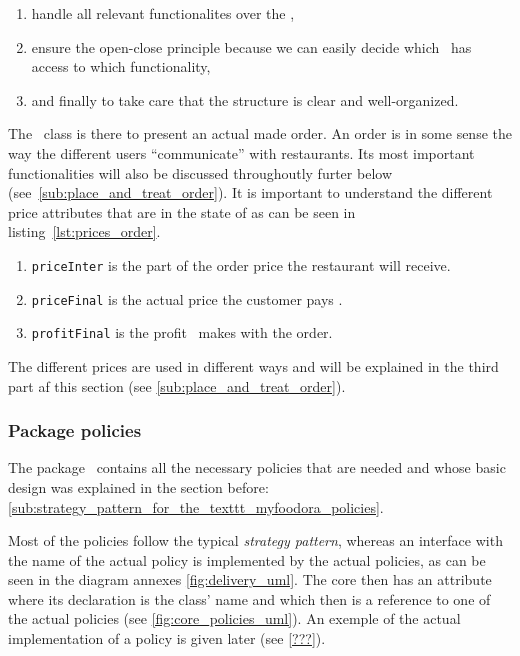 \begin{enumerate}
	\item handle all relevant functionalites over the \Core,
	\item ensure the open-close principle because we can easily decide
  which \User~has access to which functionality,
	\item and finally to take care that the structure is clear and well-organized.
\end{enumerate}

The \Order~class is there to present an actual made order.
An order is in some sense the way the different users ``communicate'' with restaurants.
Its most important functionalities will also be discussed throughoutly 
furter below (see~\ref{sub:place_and_treat_order}).
It is important to understand the different price attributes that are in 
the state of \Order as can be seen in listing~\ref{lst:prices_order}.

\begin{enumerate}
	\item \lstinline|priceInter| is the part of the order price the restaurant will receive.
	\item \lstinline|priceFinal| is the actual price the customer pays \MyFoodora.
	\item \lstinline|profitFinal| is the profit \MyFoodora~makes with the order. 
\end{enumerate}

The different prices are used in different ways
and will be explained in the third part af this section (see \ref{sub:place_and_treat_order}).


\subsubsection{Package policies} %
\label{ssub:policies}

The package \policies~contains all the necessary policies that are needed and whose basic design was explained in the section before:  \ref{sub:strategy_pattern_for_the_texttt_myfoodora_policies}. 

Most of the policies follow the typical \emph{strategy pattern}, whereas an interface with the name of the actual policy is implemented by the actual policies, as can be seen in the diagram annexes \ref{fig:delivery_uml}. The core then has an attribute where its declaration is the class' name and which then is a reference to one of the actual policies (see \ref{fig:core_policies_uml}). An exemple of the actual implementation of a policy is given later (see \ref{???}).

